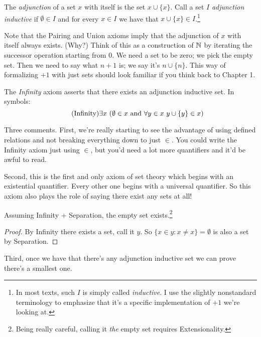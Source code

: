 \documentclass[10pt]{amsart}
\begin{document}
\begin{definition}
The \emph{adjunction} of a set $x$ with itself is the set $x \cup \{x\}$. Call a set $I$ \emph{adjunction inductive} if $\emptyset \in I$ and for every $x \in I$ we have that $x \cup \{x\} \in I$.\footnote{In most texts, such $I$ is simply called \emph{inductive}. I use the slightly nonstandard terminology to emphasize that it's a specific implementation of $+1$ we're looking at.}
\end{definition}

Note that the Pairing and Union axioms imply that the adjunction of $x$ with itself always exists. (Why?) Think of this as a construction of $\mathbb{N}$ by iterating the successor operation starting from $0$. We need a set to be zero; we pick the empty set. Then we need to say what $n + 1$ is; we say it's $n \cup \{n\}$. This way of formalizing $+1$ with just sets should look familiar if you think back to Chapter 1.

\begin{definition}
The \emph{Infinity} axiom asserts that there exists an adjunction inductive set. In symbols:
\[
\tag{Infinity}
\exists x\ (\emptyset \in x \textrm{ and } \forall y \in x\ y \cup \{y\} \in x)
\]
\end{definition}

Three comments. First, we're really starting to see the advantage of using defined relations and not breaking everything down to just $\in$. You could write the Infinity axiom just using $\in$, but you'd need a lot more quantifiers and it'd be awful to read.

Second, this is the first and only axiom of set theory which begins with an existential quantifier. Every other one begins with a universal quantifier. So this axiom also plays the role of saying there exist any sets at all!

\begin{proposition}
Assuming Infinity + Separation, the empty set exists.\footnote{Being really careful, calling it \emph{the} empty set requires Extensionality.}
\end{proposition}

\begin{proof}
By Infinity there exists a set, call it $y$. So $\{x \in y : x \ne x\} = \emptyset$ is also a set by Separation.
\end{proof}

Third, once we have that there's any adjunction inductive set we can prove there's a smallest one. 
\end{document}
